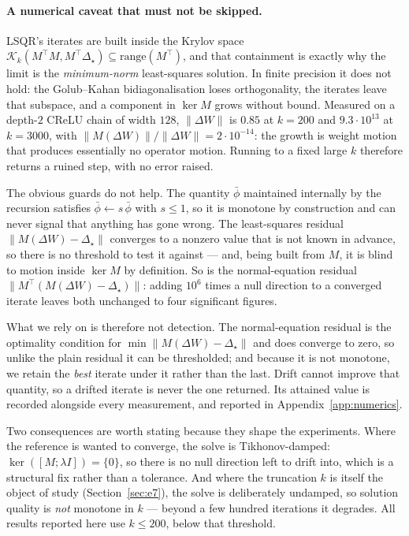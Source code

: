 \documentclass{article} %
\theoremstyle{plain}
\theoremstyle{definition}
\theoremstyle{remark}
\begin{document}
\paragraph{A numerical caveat that must not be skipped.}
LSQR's iterates are built inside the Krylov space
$\mathcal{K}_k(M^\top M, M^\top \Delta_\star) \subseteq \mathrm{range}(M^\top)$, and that
containment is exactly why the limit is the \emph{minimum-norm} least-squares solution. In finite
precision it does not hold: the Golub--Kahan bidiagonalisation loses orthogonality, the iterates
leave that subspace, and a component in $\ker M$ grows without bound. Measured on a depth-$2$
CReLU chain of width $128$, $\|\Delta W\|$ is $0.85$ at $k = 200$ and $9.3\cdot 10^{13}$ at
$k = 3000$, with $\|M(\Delta W)\| / \|\Delta W\| = 2\cdot10^{-14}$: the growth is weight motion
that produces essentially no operator motion. Running to a fixed large $k$ therefore returns a
ruined step, with no error raised.

The obvious guards do not help. The quantity $\bar\phi$ maintained internally by the recursion
satisfies $\bar\phi \leftarrow s\,\bar\phi$ with $s \le 1$, so it is monotone by construction and
can never signal that anything has gone wrong. The least-squares residual
$\|M(\Delta W) - \Delta_\star\|$ converges to a nonzero value that is not known in advance, so
there is no threshold to test it against --- and, being built from $M$, it is blind to motion
inside $\ker M$ by definition. So is the normal-equation residual
$\|M^\top(M(\Delta W) - \Delta_\star)\|$: adding $10^{6}$ times a null direction to a converged
iterate leaves both unchanged to four significant figures.

What we rely on is therefore not detection. The normal-equation residual is the optimality
condition for $\min\|M(\Delta W) - \Delta_\star\|$ and does converge to zero, so unlike the plain
residual it can be thresholded; and because it is not monotone, we retain the \emph{best} iterate
under it rather than the last. Drift cannot improve that quantity, so a drifted iterate is never
the one returned. Its attained value is recorded alongside every measurement, and reported in
Appendix~\ref{app:numerics}.

Two consequences are worth stating because they shape the experiments. Where the reference is
wanted to converge, the solve is Tikhonov-damped: $\ker([M;\lambda I]) = \{0\}$, so there is no
null direction left to drift into, which is a structural fix rather than a tolerance. And where
the truncation $k$ is itself the object of study (Section~\ref{sec:e7}), the solve is deliberately
undamped, so solution quality is \emph{not} monotone in $k$ --- beyond a few hundred iterations it
degrades. All results reported here use $k \le 200$, below that threshold.
\end{document}
